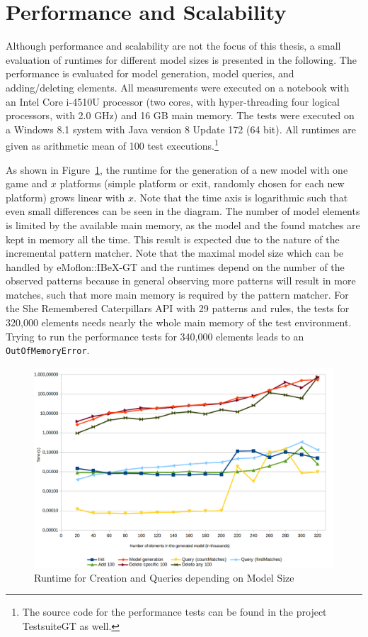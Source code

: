 \section{Performance and Scalability}
\label{evaluation-performance}
Although performance and scalability are not the focus of this thesis, a small evaluation of runtimes for different model sizes is presented in the following.
The performance is evaluated for model generation, model queries, and adding/deleting elements.
All measurements were executed on a notebook with an Intel Core i-4510U processor (two cores, with hyper-threading four logical processors, with 2.0 GHz) and 16 GB main memory.
The tests were executed on a Windows 8.1 system with Java version 8 Update 172 (64 bit).
All runtimes are given as arithmetic mean of 100 test executions.\footnote{The source code for the performance tests can be found in the project TestsuiteGT as well.}

As shown in Figure~\ref{fig:evaluation-runtime1}, the runtime for the generation of a new model with one game and $x$ platforms (simple platform or exit, randomly chosen for each new platform) grows linear with $x$.
Note that the time axis is logarithmic such that even small differences can be seen in the diagram.
The number of model elements is limited by the available main memory, as the model and the found matches are kept in memory all the time.
This result is expected due to the nature of the incremental pattern matcher.
Note that the maximal model size which can be handled by eMoflon::IBeX-GT and the runtimes depend on the number of the observed patterns because in general observing more patterns will result in more matches, such that more main memory is required by the pattern matcher.
For the She Remembered Caterpillars API with 29 patterns and rules, the tests for 320,000 elements needs nearly the whole main memory of the test environment.
Trying to run the performance tests for 340,000 elements leads to an \texttt{OutOfMemoryError}.

\begin{figure}[h!]
	\centering
	\includegraphics[width=\linewidth]{../common/figures/evaluation-runtime1-logarithmic}
	\caption{Runtime for Creation and Queries depending on Model Size}
	\label{fig:evaluation-runtime1}
\end{figure}

